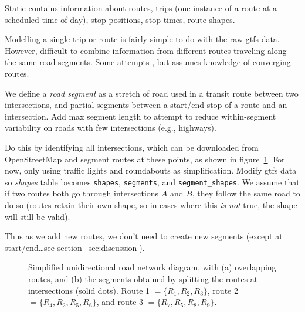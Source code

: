\documentclass[draftcls,a4paper,onecolumn]{IEEEtran}\usepackage[]{graphicx}\usepackage[]{color}
\newenvironment{knitrout}{}{} %
\begin{document}
Static contains information about routes, 
trips (one instance of a route at a scheduled time of day),
stop positions, stop times, route shapes.

Modelling a single trip or route is fairly simple to do with 
the raw \gls{gtfs} data.
However, difficult to combine information from different routes 
traveling along the same road segments.
Some attempts \cite{Yu_2011}, but assumes knowledge of converging routes.

We define a \emph{road segment} as a stretch of road used 
in a transit route between two intersections,
and partial segments between a start/end stop of a route 
and an intersection.
Add max segment length to attempt to reduce within-segment variability 
on roads with few intersections (e.g., highways).

Do this by identifying all intersections,
which can be downloaded from OpenStreetMap \cite{OpenStreetMap_2017}
and segment routes at these points,
as shown in figure~\ref{fig:route_segmentation}.
For now, only using traffic lights and roundabouts as simplification.
Modify \gls{gtfs} data so \emph{shapes} table becomes
\texttt{shapes}, \texttt{segments}, and \texttt{segment\_shapes}.
We assume that if two routes both go through intersections $A$ and $B$,
they follow the same road to do so
(routes retain their own shape, so in cases where this \emph{is not} true,
the shape will still be valid).

Thus as we add new routes, we don't need to create new segments
(except at start/end\ldots see section~\ref{sec:discussion}).


\begin{knitrout}
\color{fgcolor}\begin{figure}
\caption[Simplied diagram of overlapping routes]{Simplified unidirectional road network diagram, with (a) overlapping routes, and (b) the segments obtained by splitting the routes at intersections (solid dots). Route 1 $ = \{R_1, R_2, R_3\}$, route 2 $=\{R_4,R_2,R_5,R_6\}$, and route 3 $=\{R_7,R_5,R_8,R_9\}$.}\label{fig:route_segmentation}
\end{figure}


\end{knitrout}
\end{document}
